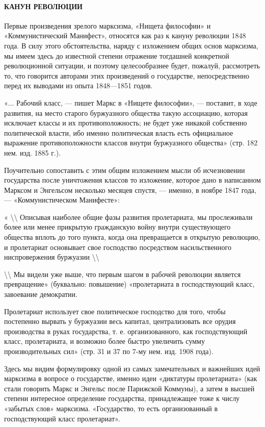 \documentclass[12pt]{article}
\newcommand\ellipsis{%
  \textbackslash\thinspace\textellipsis\textbackslash
}
\newcommand{\parnum}{(\arabic{parcount})}
\newcounter{parcount}
\newenvironment{parnumbers}{%
  \par%
  \everypar{\noindent \stepcounter{parcount}\marginpar[]{\parnum}}%
}{}
\begin{document}
\paragraph{КАНУН РЕВОЛЮЦИИ}
\begin{parnumbers}
Первые произведения зрелого марксизма, «Нищета философии» и «Коммунистический Манифест», относятся как раз к кануну революции 1848 года. В силу этого обстоятельства, наряду с изложением общих основ марксизма, мы имеем здесь до известной степени отражение тогдашней конкретной революционной ситуации, и поэтому целесообразнее будет, пожалуй, рассмотреть то, что говорится авторами этих произведений о государстве, непосредственно перед их выводами из опыта 1848—1851 годов.

«... Рабочий класс, — пишет Маркс в «Нищете философии», — поставит, в ходе развития, на место старого буржуазного общества такую ассоциацию, которая исключает классы и их противоположность; не будет уже никакой собственно политической власти, ибо именно политическая власть есть официальное выражение противоположности классов внутри буржуазного общества» (стр. 182 нем. изд. 1885 г.).

Поучительно сопоставить с этим общим изложением мысли об исчезновении государства после уничтожения классов то изложение, которое дано в написанном Марксом и Энгельсом несколько месяцев спустя, — именно, в ноябре 1847 года, — «Коммунистическом Манифесте»:

«\ellipsis Описывая наиболее общие фазы развития пролетариата, мы прослеживали более или менее прикрытую гражданскую войну внутри существующего общества вплоть до того пункта, когда она превращается в открытую революцию, и пролетариат основывает свое господство посредством насильственного ниспровержения буржуазии \ellipsis

\ellipsis Мы видели уже выше, что первым шагом в рабочей революции является превращение» (буквально: повышение) «пролетариата в господствующий класс, завоевание демократии.

Пролетариат использует свое политическое господство для того, чтобы постепенно вырвать у буржуазии весь капитал, централизовать все орудия производства в руках государства, т. е. организованного, как господствующий класс, пролетариата, и возможно более быстро увеличить сумму производительных сил» (стр. 31 и 37 по 7-му нем. изд. 1908 года).

Здесь мы видим формулировку одной из самых замечательных и важнейших идей марксизма в вопросе о государстве, именно идеи «диктатуры пролетариата» (как стали говорить Маркс и Энгельс после Парижской Коммуны), а затем в высшей степени интересное определение государства, принадлежащее тоже к числу «забытых слов» марксизма. «Государство, то есть организованный в господствующий класс пролетариат».


\end{parnumbers}
\end{document}
